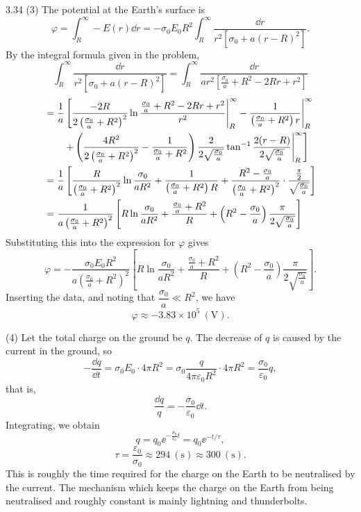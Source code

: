 \begin{solution}{3.34}
(3) The potential at the Earth's surface is
\[
\varphi=\int_R^\infty -E(r)\dd r=-\sigma_0E_0R^2\int_R^\infty\frac{\dd r}{r^2\left[\sigma_0+a(r-R)^2\right]}.
\]
By the integral formula given in the problem,
\[
\int_R^\infty\frac{\dd r}{r^2\left[\sigma_0+a(r-R)^2\right]}
=\int_R^\infty\frac{\dd r}{ar^2\left[\frac{\sigma_0}{a}+R^2-2Rr+r^2\right]}
\]
\begin{align}
&=\frac{1}{a}\left[\frac{-2R}{2\left(\frac{\sigma_0}{a}+R^2\right)^2}
\ln\frac{\frac{\sigma_0}{a}+R^2-2Rr+r^2}{r^2}\Bigg|_R^\infty
-\frac{1}{\left(\frac{\sigma_0}{a}+R^2\right)r}\Bigg|_R^\infty\right.\notag\\
&\qquad\left.+\left(\frac{4R^2}{2\left(\frac{\sigma_0}{a}+R^2\right)^2}-\frac{1}{\frac{\sigma_0}{a}+R^2}\right)
\frac{2}{2\sqrt{\frac{\sigma_0}{a}}}\tan^{-1}\frac{2(r-R)}{2\sqrt{\frac{\sigma_0}{a}}}\Bigg|_R^\infty\right]\notag\\
&=\frac{1}{a}\left[\frac{R}{\left(\frac{\sigma_0}{a}+R^2\right)^2}\ln\frac{\sigma_0}{aR^2}
+\frac{1}{\left(\frac{\sigma_0}{a}+R^2\right)R}
+\frac{R^2-\frac{\sigma_0}{a}}{\left(\frac{\sigma_0}{a}+R^2\right)^2}\cdot\frac{\frac{\pi}{2}}{\sqrt{\frac{\sigma_0}{a}}}\right]\notag\\
&=\frac{1}{a\left(\frac{\sigma_0}{a}+R^2\right)^2}\left[R\ln\frac{\sigma_0}{aR^2}
+\frac{\frac{\sigma_0}{a}+R^2}{R}+\left(R^2-\frac{\sigma_0}{a}\right)\frac{\pi}{2\sqrt{\frac{\sigma_0}{a}}}\right]
\end{align}
Substituting this into the expression for $\varphi$ gives
\[
\varphi=-\frac{\sigma_0E_0R^2}{a\left(\frac{\sigma_0}{a}+R^2\right)^2}
\left[R\ln\frac{\sigma_0}{aR^2}+\frac{\frac{\sigma_0}{a}+R^2}{R}
+\left(R^2-\frac{\sigma_0}{a}\right)\frac{\pi}{2\sqrt{\frac{\sigma_0}{a}}}\right].
\]
Inserting the data, and noting that $\dfrac{\sigma_0}{a}\ll R^2$, we have
\[
\varphi\approx-3.83\times10^5\ (\text{V}).
\]

(4) Let the total charge on the ground be $q$. The decrease of $q$ is caused by the current in the ground, so
\[
-\frac{\dd q}{\dd t}=\sigma_0E_0\cdot4\pi R^2=\sigma_0\frac{q}{4\pi\varepsilon_0R^2}\cdot4\pi R^2=\frac{\sigma_0}{\varepsilon_0}q,
\]
that is,
\[
\frac{\dd q}{q}=-\frac{\sigma_0}{\varepsilon_0}\dd t.
\]
Integrating, we obtain
\[
q=q_0\ee^{-\frac{\sigma_0}{\varepsilon_0}t}=q_0\ee^{-t/\tau},
\]
\[
\tau=\frac{\varepsilon_0}{\sigma_0}\approx294\ (\text{s})\approx300\ (\text{s}).
\]
This is roughly the time required for the charge on the Earth to be neutralised by the current. The mechanism which keeps the charge on the Earth from being neutralised and roughly constant is mainly lightning and thunderbolts.
\end{solution}

